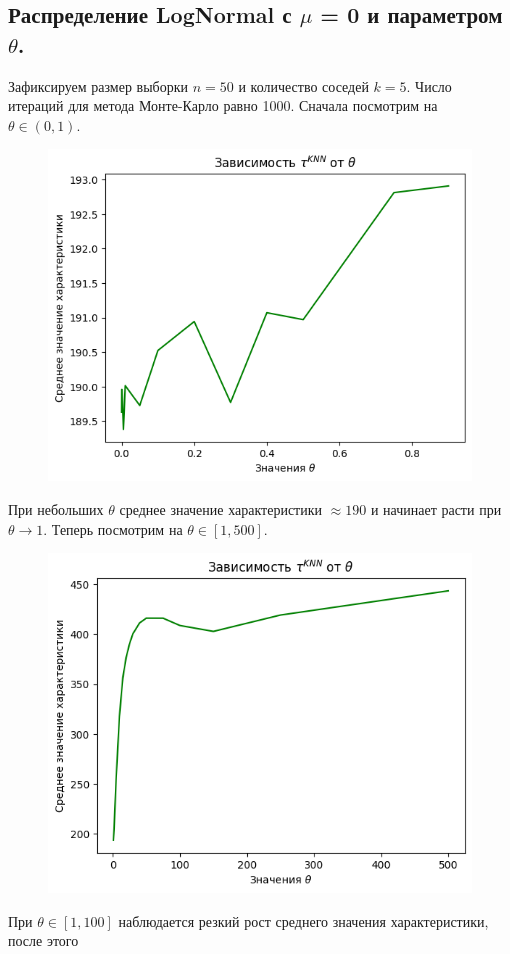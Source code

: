 \documentclass{report}
\begin{document}
\subsection{Распределение LogNormal с $\mu$ = 0 и параметром $\theta$.}
Зафиксируем размер выборки $n = 50$ и количество соседей $k = 5$. Число итераций для метода Монте-Карло равно 1000.
\newline
\newline
Сначала посмотрим на $\theta \in (0, 1).$
\begin{figure}[h]
    \centering
    \includegraphics[width=0.5\linewidth]{1.png}
\end{figure}
\newline
\newline
При небольших $\theta$ среднее значение характеристики $\approx 190$ и начинает расти при $\theta \longrightarrow 1$.
\newline
\newline
Теперь посмотрим на $\theta \in [1, 500].$
\begin{figure}[h]
    \centering
    \includegraphics[width=0.5\linewidth]{2.png}
\end{figure}
\newline
\newline
При $\theta \in [1, 100]$ наблюдается резкий рост среднего значения характеристики, после этого 
\newline
\newline
\end{document}
